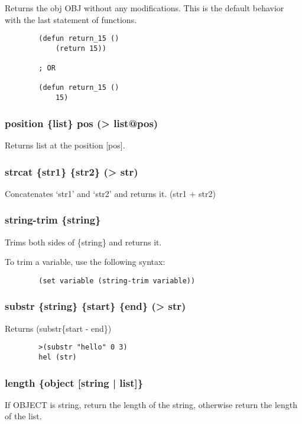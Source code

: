 \documentclass{article}
\begin{document}
	Returns the obj OBJ without any modifications. This is the default behavior with the last statement of functions.
	
	\begin{lstlisting}
		(defun return_15 ()
			(return 15))
		
		; OR
		
		(defun return_15 ()
			15)
	\end{lstlisting}
	
	\subsubsection{position \{list\}  pos (> list@pos)}

	Returns list at the position [pos].
	
	\subsubsection{strcat \{str1\} \{str2\} (> str)}
	
	Concatenates `str1' and `str2' and returns it. (str1 + str2)
	
	\subsubsection{string-trim \{string\}}

	Trims both sides of \{string\} and returns it.
	
	To trim a variable, use the following syntax:
	
	\begin{lstlisting}
		(set variable (string-trim variable))
	\end{lstlisting}

	\subsubsection{substr \{string\} \{start\} \{end\} (> str)}
	
	Returns (substr\{start - end\})
	
	\begin{lstlisting}
		>(substr "hello" 0 3)
		hel (str)
	\end{lstlisting}

	\subsubsection{length \{object [string | list]\}}

	If OBJECT is string, return the length of the string, otherwise return the length of the list.
	
\end{document}
